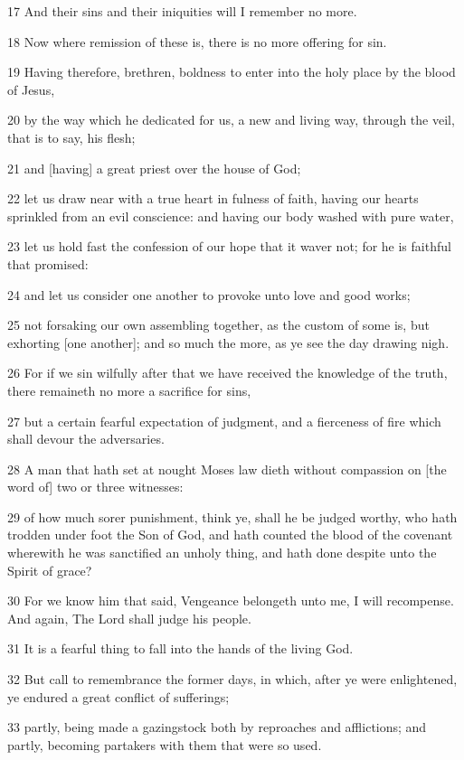 \par 17 And their sins and their iniquities will I remember no more.
\par 18 Now where remission of these is, there is no more offering for sin.
\par 19 Having therefore, brethren, boldness to enter into the holy place by the blood of Jesus,
\par 20 by the way which he dedicated for us, a new and living way, through the veil, that is to say, his flesh;
\par 21 and [having] a great priest over the house of God;
\par 22 let us draw near with a true heart in fulness of faith, having our hearts sprinkled from an evil conscience: and having our body washed with pure water,
\par 23 let us hold fast the confession of our hope that it waver not; for he is faithful that promised:
\par 24 and let us consider one another to provoke unto love and good works;
\par 25 not forsaking our own assembling together, as the custom of some is, but exhorting [one another]; and so much the more, as ye see the day drawing nigh.
\par 26 For if we sin wilfully after that we have received the knowledge of the truth, there remaineth no more a sacrifice for sins,
\par 27 but a certain fearful expectation of judgment, and a fierceness of fire which shall devour the adversaries.
\par 28 A man that hath set at nought Moses law dieth without compassion on [the word of] two or three witnesses:
\par 29 of how much sorer punishment, think ye, shall he be judged worthy, who hath trodden under foot the Son of God, and hath counted the blood of the covenant wherewith he was sanctified an unholy thing, and hath done despite unto the Spirit of grace?
\par 30 For we know him that said, Vengeance belongeth unto me, I will recompense. And again, The Lord shall judge his people.
\par 31 It is a fearful thing to fall into the hands of the living God.
\par 32 But call to remembrance the former days, in which, after ye were enlightened, ye endured a great conflict of sufferings;
\par 33 partly, being made a gazingstock both by reproaches and afflictions; and partly, becoming partakers with them that were so used.

